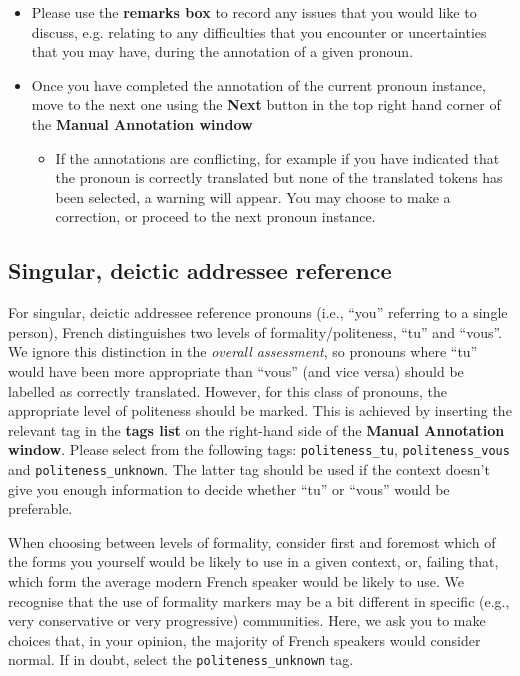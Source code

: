 \documentclass[11pt]{article} %
\newcommand\tag[1]{\texttt{#1}}
\begin{document}
\begin{itemize}
  \item Please use the \textbf{remarks box} to record any issues that you would like to discuss, e.g. relating to any difficulties that you encounter or uncertainties that you may have, during the annotation of a given pronoun.
  \item Once you have completed the annotation of the current pronoun instance, move to the next one using the \textbf{Next} button in the top right hand corner of the \textbf{Manual Annotation window}
  \begin{itemize}
    \item If the annotations are conflicting, for example if you have indicated that the pronoun is correctly translated but none of the translated tokens has been selected, a warning will appear. You may choose to make a correction, or proceed to the next pronoun instance.
  \end{itemize}
\end{itemize}

\subsection{Singular, deictic addressee reference}

For singular, deictic addressee reference pronouns (i.e., ``you'' referring to
a single person), French distinguishes two levels of formality/politeness,
``tu'' and ``vous''. We ignore this distinction in the \emph{overall
assessment},  so pronouns where ``tu'' would have been more appropriate
than ``vous'' (and vice versa) should be labelled as correctly translated.
However, for this class of pronouns, the appropriate level of politeness should
be marked. This is achieved by inserting the relevant tag in the \textbf{tags list} on the
right-hand side of the \textbf{Manual Annotation window}. Please select from the following tags:
\tag{politeness\_tu}, \tag{politeness\_vous} and \tag{politeness\_unknown}.
The latter tag should be used if the context doesn't give you enough information
to decide whether ``tu'' or ``vous'' would be preferable.

When choosing between levels of formality, consider first and foremost which of
the forms you yourself would be likely to use in a given context, or, failing
that, which form the average modern French speaker would be likely to use. We
recognise that the use of formality markers may be a bit different in specific
(e.g., very conservative or very progressive) communities. Here, we ask you to
make choices that, in your opinion, the majority of French speakers would
consider normal. If in doubt, select the
\tag{politeness\_unknown} tag.
\end{document}
